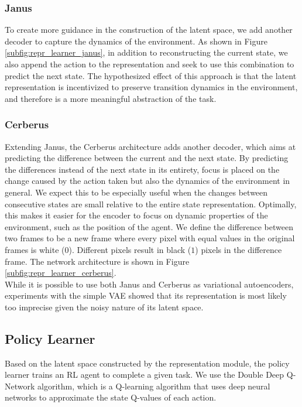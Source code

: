 \subsubsection{Janus}
To create more guidance in the construction of the latent space, we add another decoder to capture the dynamics of the environment. As shown in Figure \ref{subfig:repr_learner_janus}, in addition to reconstructing the current state, we also append the action to the representation and seek to use this combination to predict the next state.
The hypothesized effect of this approach is that the latent representation is incentivized to preserve transition dynamics in the environment, and therefore is a more meaningful abstraction of the task.

\subsubsection{Cerberus}
Extending Janus, the Cerberus architecture adds another decoder, which aims at predicting the difference between the current and the next state. By predicting the differences instead of the next state in its entirety, focus is placed on the change caused by the action taken but also the dynamics of the environment in general. We expect this to be especially useful when the changes between consecutive states are small relative to the entire state representation. Optimally, this makes it easier for the encoder to focus on dynamic properties of the environment, such as the position of the agent. We define the difference between two frames to be a new frame where every pixel with equal values in the original frames is white ($0$). Different pixels result in black ($1$) pixels in the difference frame. The network architecture is shown in Figure \ref{subfig:repr_learner_cerberus}.\\

While it is possible to use both Janus and Cerberus as variational autoencoders, experiments with the simple VAE showed that its representation is most likely too imprecise given the noisy nature of its latent space.

\subsection{Policy Learner}
Based on the latent space constructed by the representation module, the policy learner trains an RL agent to complete a given task. 
We use the Double Deep Q-Network \citep{DDQN} algorithm, which is a Q-learning algorithm that uses deep neural networks to approximate the state Q-values of each action.

